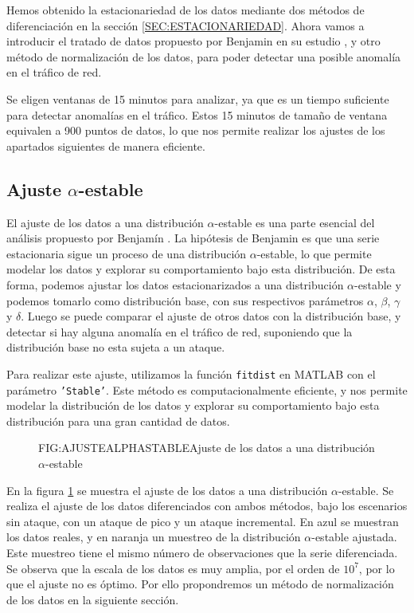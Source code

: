 
Hemos obtenido la estacionariedad de los datos mediante dos métodos de diferenciación en la sección \ref{SEC:ESTACIONARIEDAD}. Ahora vamos a introducir el tratado de datos propuesto por Benjamin en su estudio \cite{benjamin2021}, y otro método de normalización de los datos, para poder detectar una posible anomalía en el tráfico de red.

Se eligen ventanas de 15 minutos para analizar, ya que es un tiempo suficiente para detectar anomalías en el tráfico. Estos 15 minutos de tamaño de ventana equivalen a 900 puntos de datos, lo que nos permite realizar los ajustes de los apartados siguientes de manera eficiente.

\subsection{Ajuste $\alpha$-estable}
El ajuste de los datos a una distribución $\alpha$-estable es una parte esencial del análisis propuesto por Benjamín \cite{benjamin2021}. La hipótesis de Benjamin es que una serie estacionaria sigue un proceso de una distribución $\alpha$-estable, lo que permite modelar los datos y explorar su comportamiento bajo esta distribución.
De esta forma, podemos ajustar los datos estacionarizados a una distribución $\alpha$-estable y podemos tomarlo como distribución base, con sus respectivos parámetros $\alpha$, $\beta$, $\gamma$ y $\delta$.
Luego se puede comparar el ajuste de otros datos con la distribución base, y detectar si hay alguna anomalía en el tráfico de red, suponiendo que la distribución base no esta sujeta a un ataque.

Para realizar este ajuste, utilizamos la función \texttt{fitdist} en MATLAB con el parámetro \texttt{'Stable'}. Este método es computacionalmente eficiente, y nos permite modelar la distribución de los datos y explorar su comportamiento bajo esta distribución para una gran cantidad de datos.

\begin{figure}[Ajuste de los datos a una distribución $\alpha$-estable]{FIG:AJUSTEALPHASTABLE}{Ajuste de los datos a una distribución $\alpha$-estable}
    \label{FIG:AJUSTEALPHASTABLE}
\end{figure}

En la figura \ref{FIG:AJUSTEALPHASTABLE} se muestra el ajuste de los datos a una distribución $\alpha$-estable. Se realiza el ajuste de los datos diferenciados con ambos métodos, bajo los escenarios sin ataque, con un ataque de pico y un ataque incremental. En azul se muestran los datos reales, y en naranja un muestreo de la distribución $\alpha$-estable ajustada. Este muestreo tiene el mismo número de observaciones que la serie diferenciada.
Se observa que la escala de los datos es muy amplia, por el orden de $10^7$, por lo que el ajuste no es óptimo. Por ello propondremos un método de normalización de los datos en la siguiente sección.

